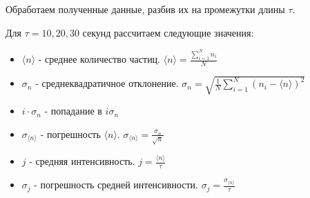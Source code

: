 \documentclass[12pt, a4paper]{article}
\begin{document}
Обработаем полученные данные, разбив их на промежутки длины
$\tau$.

\begin{center}
    Для $\tau = 10, 20, 30$ секунд рассчитаем следующие
    значения:
    \begin{itemize}
        \item $\langle n \rangle$ - среднее количество частиц.
        $\langle n \rangle = \frac{\sum_{i = 1}^{N} n_{i}}{N}$

        \item $\sigma_n$ - среднеквадратичное отклонение.
        $\sigma_n = \sqrt{\frac{1}{N}\sum_{i = 1}^{N}
        (n_{i} - \langle n \rangle)^2}$

        \item $i \cdot \sigma_n$ - попадание в $i\sigma_n$
        
        \item $\sigma_{\langle n \rangle}$ - погрешность $\langle n \rangle$.
        $\sigma_{\langle n \rangle} = \frac{\sigma_n}{\sqrt{n}}$

        \item $j$ - средняя интенсивность.
        $j = \frac{\langle n \rangle}{\tau}$

        \item $\sigma_j$ - погрешность средней интенсивности.
        $\sigma_j = \frac{\sigma_{\langle n \rangle}}{\tau}$
    \end{itemize}
\end{center}
\end{document}
